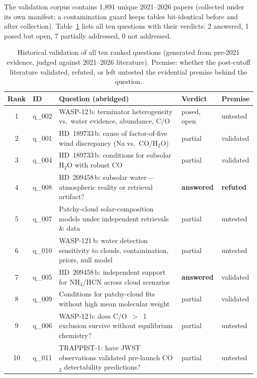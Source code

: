 The validation corpus contains 1{,}891 unique 2021--2026 papers
(collected under its own manifest; a contamination guard keeps
\corpusA{} tables bit-identical before and after collection).
Table~\ref{tab:validation} lists all ten questions with their verdicts:
2 answered, 1 posed but open, 7 partially addressed, 0 not addressed.

\begin{table}[t]
  \centering
  \caption{Historical validation of all ten ranked questions (generated
  from pre-2021 evidence, judged against 2021--2026 literature).
  Premise: whether the post-cutoff literature validated, refuted, or
  left untested the evidential premise behind the question.}
  \label{tab:validation}
  \small
  \begin{tabular}{clp{7.6cm}ll}
    \toprule
    Rank & ID & Question (abridged) & Verdict & Premise \\
    \midrule
    1 & q\_002 & WASP-12\,b: terminator heterogeneity vs.\ water
        evidence, abundance, C/O & posed, open & untested \\
    2 & q\_001 & HD~189733\,b: cause of factor-of-five wind
        discrepancy (Na vs.\ CO/H$_2$O) & partial & validated \\
    3 & q\_004 & HD~189733\,b: conditions for subsolar H$_2$O with
        robust CO & partial & validated \\
    4 & q\_008 & HD~209458\,b: subsolar water---atmospheric reality or
        retrieval artifact? & \textbf{answered} & \textbf{refuted} \\
    5 & q\_007 & Patchy-cloud solar-composition models under
        independent retrievals \& data & partial & untested \\
    6 & q\_010 & WASP-121\,b: water detection sensitivity to clouds,
        contamination, priors, null model & partial & untested \\
    7 & q\_005 & HD~209458\,b: independent support for NH$_3$/HCN
        across cloud scenarios & \textbf{answered} & validated \\
    8 & q\_009 & Conditions for patchy-cloud fits without high mean
        molecular weight & partial & validated \\
    9 & q\_006 & WASP-12\,b: does C/O~$>$~1 exclusion survive without
        equilibrium chemistry? & partial & untested \\
    10 & q\_011 & TRAPPIST-1: have JWST observations validated
        pre-launch CO$_2$ detectability predictions? & partial & untested \\
    \bottomrule
  \end{tabular}
\end{table}

